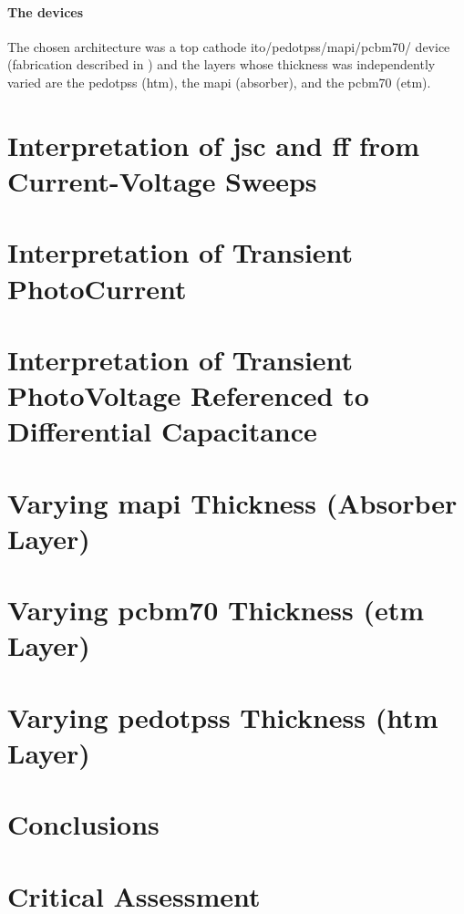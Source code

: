 	\paragraph{The devices} The chosen architecture was a top cathode \gls{ito}/\gls{pedotpss}/\gls{mapi}/\gls{pcbm70}/ device (fabrication described in ) and the layers whose thickness was independently varied are the \gls{pedotpss} (\gls{htm}), the \gls{mapi} (absorber), and the \gls{pcbm70} (\gls{etm}).

\section{Interpretation of \gls{jsc} and \gls{ff} from Current-Voltage Sweeps}

\section{Interpretation of Transient PhotoCurrent}\label{interpretation_tpc}

\section{Interpretation of Transient PhotoVoltage Referenced to Differential Capacitance}\label{interpretation_tpvdc}


\section{Varying \gls{mapi} Thickness (Absorber Layer)}


\section{Varying \gls{pcbm70} Thickness (\gls{etm} Layer)}
\section{Varying \gls{pedotpss} Thickness (\gls{htm} Layer)}
\section{Conclusions}
\section{Critical Assessment}
